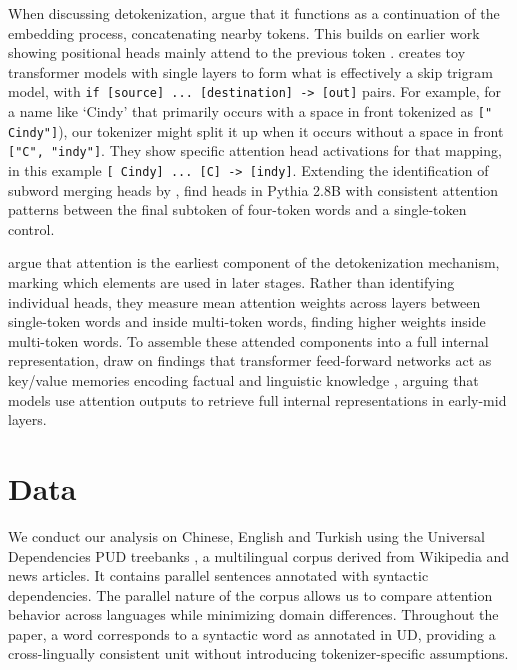 \documentclass[11pt]{article}
\begin{document}
When discussing detokenization, \citet{lad2024} argue that it functions as a continuation of the embedding process, concatenating nearby tokens. This builds on earlier work showing positional heads mainly attend to the previous token \citep{correia2019, elhage2021}. \citet{elhage2021} creates toy transformer models with single layers to form what is effectively a skip trigram model, with \texttt{if [source] ... [destination] -> [out]} pairs. For example, for a name like `Cindy' that primarily occurs with a space in front tokenized as \texttt{[" Cindy"]}), our tokenizer might split it up when it occurs without a space in front \texttt{["C", "indy"]}. They show specific attention head activations for that mapping, in this example \texttt{[ Cindy] ... [C] -> [indy]}. Extending the identification of subword merging heads by \citet{ferrando2024}, \citet{lad2024} find heads in Pythia 2.8B with consistent attention patterns between the final subtoken of four-token words and a single-token control.

\citet{kaplan2025} argue that attention is the earliest component of the detokenization mechanism, marking which elements are used in later stages. Rather than identifying individual heads, they measure mean attention weights across layers between single-token words and inside multi-token words, finding higher weights inside multi-token words. To assemble these attended components into a full internal representation, \citet{kaplan2025} draw on findings that transformer feed-forward networks act as key/value memories encoding factual and linguistic knowledge \citep{geva2021, meng2022}, arguing that models use attention outputs to retrieve full internal representations in early-mid layers.

\section{Data}\label{sec:data}
We conduct our analysis on Chinese, English and Turkish using the Universal Dependencies PUD treebanks \citep{nivre2020, akhundjanova2025}, a multilingual corpus derived from Wikipedia and news articles. It contains parallel sentences annotated with syntactic dependencies. The parallel nature of the corpus allows us to compare attention behavior across languages while minimizing domain differences. Throughout the paper, a word corresponds to a syntactic word as annotated in UD, providing a cross-lingually consistent unit without introducing tokenizer-specific assumptions.
\end{document}
